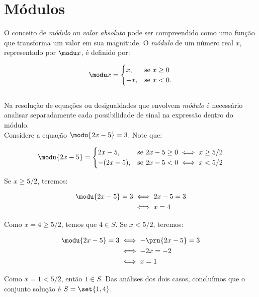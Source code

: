 \section{Módulos}
O conceito de \emph{módulo} ou \emph{valor absoluto} pode ser compreendido como uma função que transforma um valor em sua magnitude. O \emph{módulo} de um número real $x$, representado por $\modu x$, é definido por:

$$
\modu x =
\begin{cases}
x , & \text{se $x \ge 0$} \\
-x, & \text{se $x<0$}.
\end{cases}
$$
\\

Na resolução de equações ou desigualdades que envolvem \emph{módulo} é necessário analisar separadamente cada possibilidade de sinal na expressão dentro do módulo. 
\\

Considere a equação $\modu{2x - 5} = 3$. Note que:

\begin{align*}
    \modu{2x-5} = 
    \begin{cases}
    2x-5,    & \text{se } 2x-5 \ge 0 \iff x \ge 5/2 \\
    -(2x-5), & \text{se } 2x-5 < 0 \iff x < 5/2
    \end{cases}
\end{align*}

Se $x \ge 5/2$, teremos:

\begin{align*}
\modu{2x-5}=3 &\iff 2x-5=3 \\
              &\iff x=4
\end{align*}

Como $x=4\ge5/2$, temos que $4 \in S$. Se $x<5/2$, teremos:

\begin{align*}
    \modu{2x-5}=3 &\iff -\prn{2x-5} = 3 \\
                  &\iff -2x = -2 \\
                  &\iff x = 1 
\end{align*}

Como $x=1<5/2$, então $1 \in S$. Das análises dos dois casos, concluímos que o conjunto solução é $S=\set{1,4}$.
